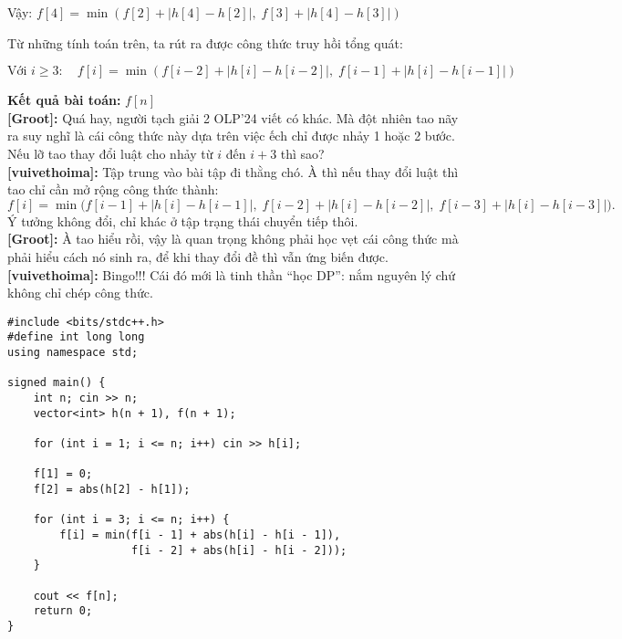 Vậy: $ f[4] = \min \left( f[2] + |h[4] - h[2]|, \; f[3] + |h[4] - h[3]| \right) $


Từ những tính toán trên, ta rút ra được công thức truy hồi tổng quát:

\[
\text{Với } i \geq 3: \quad f[i] = \min \left( f[i - 2] + |h[i] - h[i-2]|, \; f[i - 1] + |h[i] - h[i-1]| \right)
\]

\textbf{Kết quả bài toán:} $f[n]$\\

\textbf{[Groot]:} Quá hay, người tạch giải 2 OLP'24 viết có khác. Mà đột nhiên tao nãy ra suy nghĩ là cái công thức này dựa trên việc ếch chỉ được nhảy 1 hoặc 2 bước. Nếu lỡ tao thay đổi luật cho nhảy từ $i$ đến $i + 3$ thì sao?\\

\textbf{[vuivethoima]:} Tập trung vào bài tập đi thằng chó. À thì nếu thay đổi luật thì tao chỉ cần mở rộng công thức thành:
\[
f[i] = \min \Big( 
    f[i-1] + |h[i] - h[i-1]|,\;
    f[i-2] + |h[i] - h[i-2]|,\;
    f[i-3] + |h[i] - h[i-3]|
\Big).
\]
Ý tưởng không đổi, chỉ khác ở tập trạng thái chuyển tiếp thôi.\\

\textbf{[Groot]:} À tao hiểu rồi, vậy là quan trọng không phải học vẹt cái công thức mà phải hiểu cách nó sinh ra, để khi thay đổi đề thì vẫn ứng biến được.\\

\textbf{[vuivethoima]:} Bingo!!! Cái đó mới là tinh thần ``học DP'': nắm nguyên lý chứ không chỉ chép công thức. 

\begin{lstlisting}[title=\centering \textbf{Cài đặt}]
#include <bits/stdc++.h>
#define int long long
using namespace std;

signed main() {
    int n; cin >> n;
    vector<int> h(n + 1), f(n + 1);

    for (int i = 1; i <= n; i++) cin >> h[i];

    f[1] = 0;
    f[2] = abs(h[2] - h[1]);

    for (int i = 3; i <= n; i++) {
        f[i] = min(f[i - 1] + abs(h[i] - h[i - 1]),
                   f[i - 2] + abs(h[i] - h[i - 2]));
    }

    cout << f[n];
    return 0;
}
\end{lstlisting}

